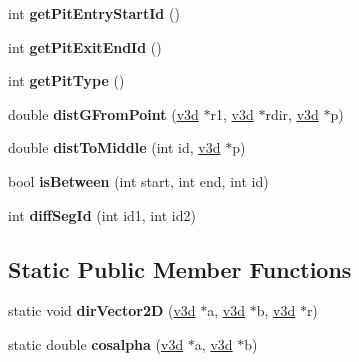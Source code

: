 \begin{DoxyCompactItemize}
\item 
\hypertarget{class_track_desc_a8479981db1b320bd972da62eb15c443e}{int {\bfseries get\-Pit\-Entry\-Start\-Id} ()}\label{class_track_desc_a8479981db1b320bd972da62eb15c443e}

\item 
\hypertarget{class_track_desc_afba388172d908873657d402230580ec3}{int {\bfseries get\-Pit\-Exit\-End\-Id} ()}\label{class_track_desc_afba388172d908873657d402230580ec3}

\item 
\hypertarget{class_track_desc_af8bd326841116e9466896ee2ae9fc774}{int {\bfseries get\-Pit\-Type} ()}\label{class_track_desc_af8bd326841116e9466896ee2ae9fc774}

\item 
\hypertarget{class_track_desc_aff51b915b4dac170d5e4e2386dfe15ef}{double {\bfseries dist\-G\-From\-Point} (\hyperlink{classv3d}{v3d} $\ast$r1, \hyperlink{classv3d}{v3d} $\ast$rdir, \hyperlink{classv3d}{v3d} $\ast$p)}\label{class_track_desc_aff51b915b4dac170d5e4e2386dfe15ef}

\item 
\hypertarget{class_track_desc_aef0023623ebfab64e2207ef5c990ebc7}{double {\bfseries dist\-To\-Middle} (int id, \hyperlink{classv3d}{v3d} $\ast$p)}\label{class_track_desc_aef0023623ebfab64e2207ef5c990ebc7}

\item 
\hypertarget{class_track_desc_a644a0758cf87af94abfa3f33d5d35d33}{bool {\bfseries is\-Between} (int start, int end, int id)}\label{class_track_desc_a644a0758cf87af94abfa3f33d5d35d33}

\item 
\hypertarget{class_track_desc_af132abf020b6bb95247f6e452373d0e2}{int {\bfseries diff\-Seg\-Id} (int id1, int id2)}\label{class_track_desc_af132abf020b6bb95247f6e452373d0e2}

\end{DoxyCompactItemize}
\subsection*{Static Public Member Functions}
\begin{DoxyCompactItemize}
\item 
\hypertarget{class_track_desc_a87ad11d4bf01b47cd4e86813a4586d87}{static void {\bfseries dir\-Vector2\-D} (\hyperlink{classv3d}{v3d} $\ast$a, \hyperlink{classv3d}{v3d} $\ast$b, \hyperlink{classv3d}{v3d} $\ast$r)}\label{class_track_desc_a87ad11d4bf01b47cd4e86813a4586d87}

\item 
\hypertarget{class_track_desc_a698f9eb5265ad764063ac2f2b6a308c6}{static double {\bfseries cosalpha} (\hyperlink{classv3d}{v3d} $\ast$a, \hyperlink{classv3d}{v3d} $\ast$b)}\label{class_track_desc_a698f9eb5265ad764063ac2f2b6a308c6}

\end{DoxyCompactItemize}
